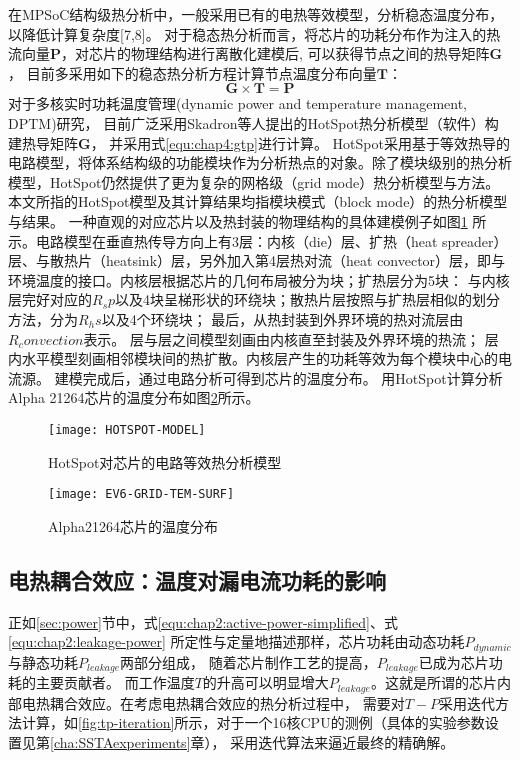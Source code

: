 在MPSoC结构级热分析中，一般采用已有的电热等效模型，分析稳态温度分布，以降低计算复杂度[7,8]。 对于稳态热分析而言，将芯片的功耗分布作为注入的热流向量$\mathbf{P}$，对芯片的物理结构进行离散化建模后, 可以获得节点之间的热导矩阵$\mathbf{G}$， 目前多采用如下的稳态热分析方程计算节点温度分布向量$\mathbf{T}$：
\begin{equation}
\label{equ:chap4:gtp}
\mathbf{G} \times \mathbf{T} = \mathbf{P}
\end{equation}
对于多核实时功耗温度管理(dynamic power and temperature management, DPTM)研究， 目前广泛采用Skadron等人提出的HotSpot热分析模型（软件）构建热导矩阵$\mathbf{G}$， 并采用式\ref{equ:chap4:gtp}进行计算。 HotSpot采用基于等效热导的电路模型，将体系结构级的功能模块作为分析热点的对象。除了模块级别的热分析模型，HotSpot仍然提供了更为复杂的网格级（grid mode）热分析模型与方法。本文所指的HotSpot模型及其计算结果均指模块模式（block mode）的热分析模型与结果。 一种直观的对应芯片以及热封装的物理结构的具体建模例子如图\ref{fig:hotspot-model} 所示。电路模型在垂直热传导方向上有3层：内核（die）层、扩热（heat spreader）层、与散热片（heatsink）层，另外加入第4层热对流（heat convector）层，即与环境温度的接口。内核层根据芯片的几何布局被分为块；扩热层分为5块： 与内核层完好对应的$R_sp$以及4块呈梯形状的环绕块；散热片层按照与扩热层相似的划分方法，分为$R_hs$以及4个环绕块； 最后，从热封装到外界环境的热对流层由$R_convection$表示。 层与层之间模型刻画由内核直至封装及外界环境的热流； 层内水平模型刻画相邻模块间的热扩散。内核层产生的功耗等效为每个模块中心的电流源。 建模完成后，通过电路分析可得到芯片的温度分布。 用HotSpot计算分析Alpha 21264芯片的温度分布如图\ref{fig:ev6-grid-temp-surf}所示。

\begin{figure}[H]
  \centering
  \texttt{[image: HOTSPOT-MODEL]}
  \caption{HotSpot对芯片的电路等效热分析模型}
  \label{fig:hotspot-model}
\end{figure}

\begin{figure}[H]
  \centering
  \texttt{[image: EV6-GRID-TEM-SURF]}
  \caption{Alpha21264芯片的温度分布}
  \label{fig:ev6-grid-temp-surf}
\end{figure}


\subsection{电热耦合效应：温度对漏电流功耗的影响}
正如\ref{sec:power}节中，式\ref{equ:chap2:active-power-simplified}、式\ref{equ:chap2:leakage-power} 所定性与定量地描述那样，芯片功耗由动态功耗$P_{dynamic}$与静态功耗$P_{leakage}$两部分组成， 随着芯片制作工艺的提高，$P_{leakage}$已成为芯片功耗的主要贡献者。 而工作温度$T$的升高可以明显增大$P_{leakage}$。这就是所谓的芯片内部电热耦合效应。在考虑电热耦合效应的热分析过程中， 需要对$T-P$采用迭代方法计算，如\ref{fig:tp-iteration}所示，对于一个16核CPU的测例（具体的实验参数设置见第\ref{cha:SSTAexperiments}章）， 采用迭代算法来逼近最终的精确解。

